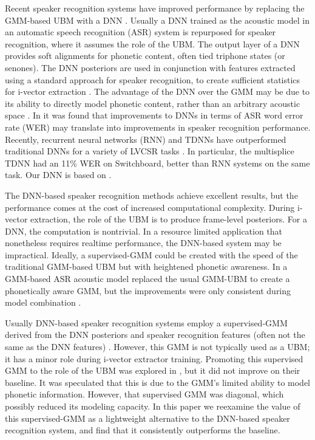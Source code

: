 \documentclass{article}
\begin{document}
Recent speaker recognition systems have improved performance by replacing 
the GMM-based UBM with a DNN \cite{lei2014, garcia2014}. 
Usually a DNN trained as the acoustic model in
an automatic speech recognition (ASR) system is repurposed for
speaker recognition, where it assumes the role of the UBM.
The output layer of a DNN provides soft alignments for
phonetic content, often tied triphone states (or senones). 
The DNN posteriors are used in conjunction with features extracted using a 
standard approach for speaker recognition, to create sufficient statistics
for i-vector extraction \cite{ivector}.
The advantage of the DNN over the GMM may
be due to its ability to directly model phonetic content, rather than an arbitrary
acoustic space \cite{lei2014, garcia2014, kenny2014deep}. In \cite{garcia2014} it was found that
improvements to DNNs in terms of ASR word error rate (WER) may translate into 
improvements in speaker
recognition performance. Recently, recurrent neural networks (RNN) and TDNNs \cite{tdnn} have
outperformed traditional DNNs for a variety of LVCSR tasks \cite{lstm, saon2014, multisplice}.
In particular, the multisplice TDNN \cite{multisplice} had an 11\% WER
on Switchboard, better than RNN systems on the same task.
Our DNN is based on \cite{multisplice}. 

The DNN-based speaker recognition methods achieve excellent results, but the
performance comes at the cost of increased computational complexity. During
i-vector extraction, the role of the UBM is to produce frame-level posteriors.
For a DNN, the computation is nontrivial. In a resource limited application
that nonetheless requires realtime performance, the DNN-based system may
be impractical. Ideally, a supervised-GMM could be created with the 
speed of the traditional GMM-based UBM but with heightened phonetic awareness.
In \cite{omar2010} a GMM-based ASR acoustic model replaced the usual GMM-UBM
to create a phonetically aware GMM, but the improvements were only consistent
during model combination \cite{omar2010}.

Usually DNN-based speaker recognition systems employ a supervised-GMM
derived from the DNN posteriors and speaker recognition features (often
not the same as the DNN features) \cite{lei2014, garcia2014, kenny2014deep}.
However, this GMM is not typically
used as a UBM; it has a minor role during i-vector extractor training.
Promoting this supervised GMM to the role of the UBM was explored
in \cite{lei2014}, but it did not improve on their baseline.
It was speculated that this is due
to the GMM's limited ability to model phonetic information. However,
that supervised GMM was diagonal, which possibly
reduced its modeling capacity. In this paper we reexamine the 
value of this supervised-GMM as a lightweight alternative to the DNN-based
speaker recognition system, and find that it consistently outperforms the
baseline.
\end{document}
